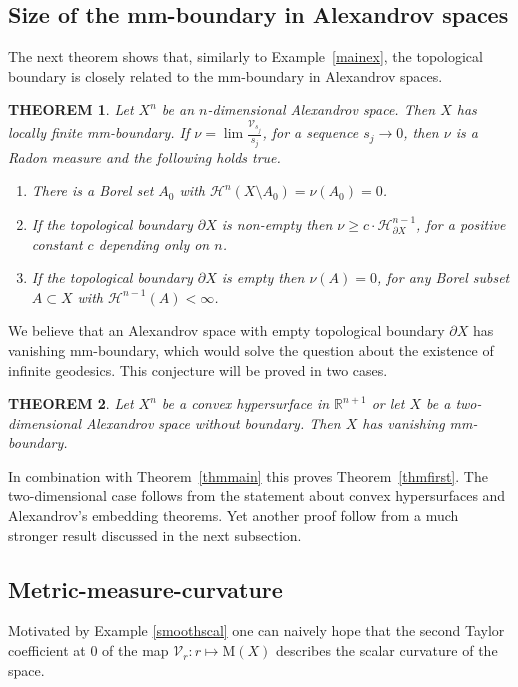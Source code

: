 \documentclass[12pt,leqno,intlimits]{amsart}
\numberwithin{equation}{section}
\newtheorem{thm}{THEOREM}[section]
\theoremstyle{definition}
\theoremstyle{remark}
\newcommand{\tref}[1]{Theorem~\ref{#1}}
\newcommand{\exref}[1]{Example~\ref{#1}}
\newcommand{\R}{\mathbb{R}}
\begin{document}
\subsection{Size of the mm-boundary in Alexandrov spaces}
The next theorem shows that, similarly to \exref{mainex}, the topological boundary is closely related to the mm-boundary in Alexandrov spaces.

\begin{thm} \label{alexandrovthm}
Let $X^n$ be an $n$-dimensional Alexandrov space.
Then $X$ has locally finite mm-boundary.
If $ \nu= \lim \frac{\mathcal{V}_{s_j}}{s_j}$, for a sequence $s_j \to 0 $, then $\nu$ is a Radon measure and
the following holds true.
\begin{enumerate}
\item\label{full-measure-zero-nu}There is a Borel set $A_0$ with $\mathcal H^n (X\setminus A_0) = \nu (A_0)=0$.
\item\label{bry-nu} If the topological boundary $\partial X$ is non-empty then $\nu \geq c \cdot \mathcal H^{n-1} _{\partial X}$,
for a positive constant $c$ depending only on $n$.
\item \label{n-1-nu} If the topological boundary $\partial X$ is empty then $\nu (A)=0$, for any Borel subset $A\subset X$ with $\mathcal H^{n-1} (A)<\infty$.
\end{enumerate}
\end{thm}

We believe that an Alexandrov space with empty topological boundary $\partial X$ has vanishing mm-boundary,
which would solve the question about the existence of infinite geodesics.
This conjecture will be proved in two cases.

\begin{thm} \label{hypersurface}
Let $X^n$ be a convex hypersurface in $\R^{n+1}$ or let $X$ be a two-dimensional Alexandrov space without boundary.
Then $X$ has vanishing  mm-boundary.
\end{thm}

In combination with \tref{thmmain} this proves \tref{thmfirst}.
The two-dimensional case follows from the statement about convex hypersurfaces and Alexandrov's embedding theorems.
Yet another proof follow from a much stronger result discussed in the next subsection.

\subsection{Metric-measure-curvature} \label{subsec:curv}
Motivated by Example \ref{smoothscal} one can naively hope that the second Taylor coefficient at $0$ of the
map $\mathcal{V}_r\colon r\mapsto \mathrm M(X)$ describes the scalar curvature of the space.
\end{document}
